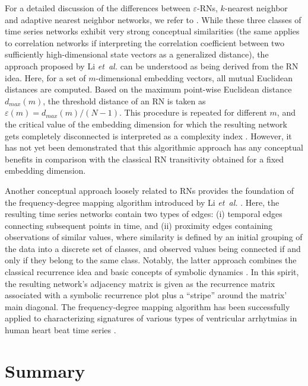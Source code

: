\documentclass[graybox]{svmult}
\begin{document}
For a detailed discussion of the differences between $\varepsilon$-RNs, $k$-nearest neighbor and adaptive nearest neighbor networks, we refer to \cite{Donner2011IJBC}. While these three classes of time series networks exhibit very strong conceptual similarities (the same applies to correlation networks \cite{Yang2008} if interpreting the correlation coefficient between two sufficiently high-dimensional state vectors as a generalized distance), the approach proposed by Li \textit{et~al.} \cite{Li2011a,Li2011b} can be understood as being derived from the RN idea. Here, for a set of $m$-dimensional embedding vectors, all mutual Euclidean distances are computed. Based on the maximum point-wise Euclidean distance $d_{max}(m)$, the threshold distance of an RN is taken as $\varepsilon(m)=d_{max}(m)/(N-1)$. This procedure is repeated for different $m$, and the critical value of the embedding dimension for which the resulting network gets completely disconnected is interpreted as a complexity index \cite{Cao2013}. However, it has not yet been demonstrated that this algorithmic approach has any conceptual benefits in comparison with the classical RN transitivity obtained for a fixed embedding dimension.

Another conceptual approach loosely related to RNs provides the foundation of the frequency-degree mapping algorithm introduced by Li \textit{et~al.} \cite{Li2012}. Here, the resulting time series networks contain two types of edges: (i) temporal edges connecting subsequent points in time, and (ii) proximity edges containing observations of similar values, where similarity is defined by an initial grouping of the data into a discrete set of classes, and observed values being connected if and only if they belong to the same class. Notably, the latter approach combines the classical recurrence idea and basic concepts of symbolic dynamics \cite{Daw2003}. In this spirit, the resulting network's adjacency matrix is given as the recurrence matrix associated with a symbolic recurrence plot \cite{Donner2008,Faure2010,Graben2013} plus a ``stripe'' around the matrix' main diagonal. The frequency-degree mapping algorithm has been successfully applied to characterizing signatures of various types of ventricular arrhytmias in human heart beat time series \cite{Li2012}.

%
%


\section{Summary}
\end{document}
